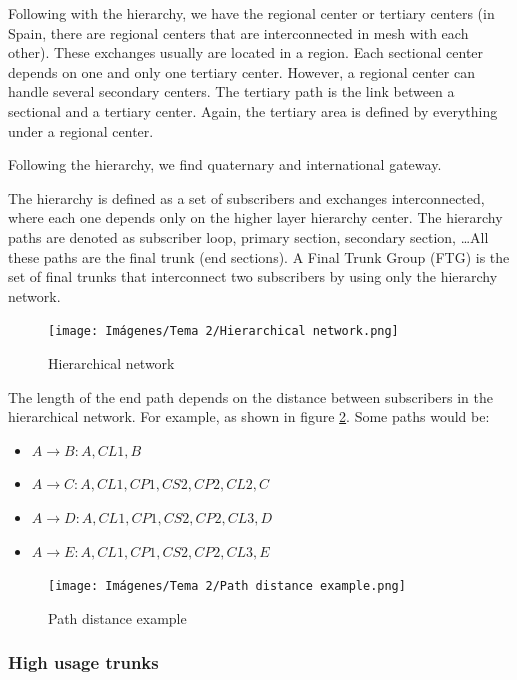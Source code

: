 \documentclass[
	12pt,
	twoside
]{book}
\begin{document}
Following with the hierarchy, we have the regional center or tertiary centers (in Spain, there are regional centers that are interconnected in mesh with each other). These exchanges usually are located in a region. Each sectional center depends on one and only one tertiary center. However, a regional center can handle several secondary centers. The tertiary path is the link between a sectional and a tertiary center. Again, the tertiary area is defined by everything under a regional center.

Following the hierarchy, we find quaternary and international gateway.

The hierarchy is defined as a set of subscribers and exchanges interconnected, where each one depends only on the higher layer hierarchy center. The hierarchy paths are denoted as subscriber loop, primary section, secondary section, \ldots All these paths are the final trunk (end sections). A Final Trunk Group (FTG) is the set of final trunks that interconnect two subscribers by using only the hierarchy network.

\begin{figure}[H]
	\centering
	\texttt{[image: Imágenes/Tema 2/Hierarchical network.png]}
	\caption{
		\label{fig:unit2_hierarchy}
		Hierarchical network
	}
\end{figure}

The length of the end path depends on the distance between subscribers in the hierarchical network. For example, as shown in figure \ref{fig:unit2_dist_example}. Some paths would be:

\begin{itemize}
	\item $A \rightarrow B: A, CL1, B$
	\item $A \rightarrow C: A, CL1, CP1, CS2, CP2, CL2, C$
	\item $A \rightarrow D: A, CL1, CP1, CS2, CP2, CL3, D$
	\item $A \rightarrow E: A, CL1, CP1, CS2, CP2, CL3, E$
\end{itemize}

\begin{figure}[H]
	\centering
	\texttt{[image: Imágenes/Tema 2/Path distance example.png]}
	\caption{
		\label{fig:unit2_dist_example}
		Path distance example
	}
\end{figure}

\subsubsection{High usage trunks}
\end{document}
